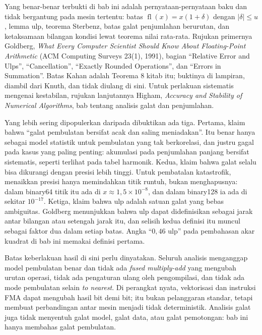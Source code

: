 \begin{untukpeneliti}
Yang benar-benar terbukti di bab ini adalah pernyataan-pernyataan baku dan tidak
bergantung pada mesin tertentu: batas $\operatorname{fl}(x)=x(1+\delta)$ dengan
$|\delta|\le u$, lemma ulp, teorema Sterbenz, batas galat penjumlahan berurutan, dan
ketaksamaan bilangan kondisi lewat teorema nilai rata-rata. Rujukan primernya Goldberg,
\emph{What Every Computer Scientist Should Know About Floating-Point Arithmetic}
(ACM Computing Surveys 23(1), 1991), bagian ``Relative Error and Ulps'',
``Cancellation'', ``Exactly Rounded Operations'', dan ``Errors in Summation''. Batas
Kahan adalah Teorema 8 kitab itu; buktinya di lampiran, diambil dari Knuth, dan tidak
diulang di sini. Untuk perlakuan sistematis mengenai kestabilan, rujukan lanjutannya
Higham, \emph{Accuracy and Stability of Numerical Algorithms}, bab tentang analisis
galat dan penjumlahan.

Yang lebih sering dipopulerkan daripada dibuktikan ada tiga. Pertama, klaim bahwa
``galat pembulatan bersifat acak dan saling meniadakan''. Itu benar hanya sebagai
model statistik untuk pembulatan yang tak berkorelasi, dan justru gagal pada kasus
yang paling penting: akumulasi pada penjumlahan panjang bersifat sistematis, seperti
terlihat pada tabel harmonik. Kedua, klaim bahwa galat selalu bisa dikurangi dengan
presisi lebih tinggi. Untuk pembatalan katastrofik, menaikkan presisi hanya
memindahkan titik runtuh, bukan menghapusnya: dalam binary64 titik itu ada di
$x\approx1{,}5\times10^{-8}$, dan dalam binary128 ia ada di sekitar $10^{-17}$. Ketiga,
klaim bahwa ulp adalah satuan galat yang bebas ambiguitas. Goldberg menunjukkan bahwa
ulp dapat didefinisikan sebagai jarak antar bilangan atau setengah jarak itu, dan
selisih kedua definisi itu muncul sebagai faktor dua dalam setiap batas. Angka
``$0{,}46$ ulp'' pada pembahasan akar kuadrat di bab ini memakai definisi pertama.

Batas keberlakuan hasil di sini perlu dinyatakan. Seluruh analisis menganggap model
pembulatan benar dan tidak ada \emph{fused multiply-add} yang mengubah urutan operasi,
tidak ada pengaturan ulang oleh pengompilasi, dan tidak ada mode pembulatan selain
\emph{to nearest}. Di perangkat nyata, vektorisasi dan instruksi FMA dapat mengubah
hasil bit demi bit; itu bukan pelanggaran standar, tetapi membuat perbandingan antar
mesin menjadi tidak deterministik. Analisis galat juga tidak menyentuh galat model,
galat data, atau galat pemotongan: bab ini hanya membahas galat pembulatan.


\end{untukpeneliti}
